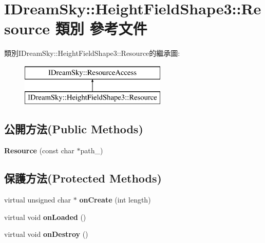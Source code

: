 \hypertarget{class_i_dream_sky_1_1_height_field_shape3_1_1_resource}{}\section{I\+Dream\+Sky\+:\+:Height\+Field\+Shape3\+:\+:Resource 類別 參考文件}
\label{class_i_dream_sky_1_1_height_field_shape3_1_1_resource}
類別\+I\+Dream\+Sky\+:\+:Height\+Field\+Shape3\+:\+:Resource的繼承圖\+:\begin{figure}[H]
\begin{center}
\leavevmode
\includegraphics[height=2.000000cm]{class_i_dream_sky_1_1_height_field_shape3_1_1_resource}
\end{center}
\end{figure}
\subsection*{公開方法(Public Methods)}
\begin{DoxyCompactItemize}
\item 
{\bfseries Resource} (const char $\ast$path\+\_\+)\hypertarget{class_i_dream_sky_1_1_height_field_shape3_1_1_resource_a8992a3e14c3523a358a860b557eacc2c}{}\label{class_i_dream_sky_1_1_height_field_shape3_1_1_resource_a8992a3e14c3523a358a860b557eacc2c}

\end{DoxyCompactItemize}
\subsection*{保護方法(Protected Methods)}
\begin{DoxyCompactItemize}
\item 
virtual unsigned char $\ast$ {\bfseries on\+Create} (int length)\hypertarget{class_i_dream_sky_1_1_height_field_shape3_1_1_resource_ab95a4a8fdaf7c715459245c412e9f301}{}\label{class_i_dream_sky_1_1_height_field_shape3_1_1_resource_ab95a4a8fdaf7c715459245c412e9f301}

\item 
virtual void {\bfseries on\+Loaded} ()\hypertarget{class_i_dream_sky_1_1_height_field_shape3_1_1_resource_a9132bc027b0df630bdc8a50ce0d7958f}{}\label{class_i_dream_sky_1_1_height_field_shape3_1_1_resource_a9132bc027b0df630bdc8a50ce0d7958f}

\item 
virtual void {\bfseries on\+Destroy} ()\hypertarget{class_i_dream_sky_1_1_height_field_shape3_1_1_resource_a2317128aade9753238e475381d410df5}{}\label{class_i_dream_sky_1_1_height_field_shape3_1_1_resource_a2317128aade9753238e475381d410df5}

\end{DoxyCompactItemize}
